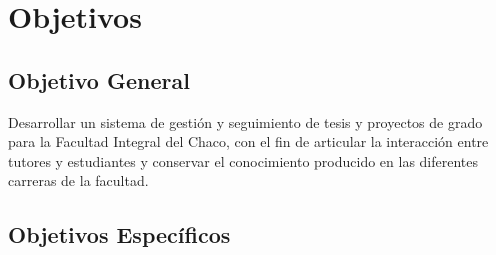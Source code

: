 \section{Objetivos}
\label{sec:objetivos}

\subsection{Objetivo General}
Desarrollar un sistema de gestión y seguimiento de tesis y proyectos de grado para la Facultad Integral del Chaco, con el fin de articular la interacción entre tutores y estudiantes y conservar el conocimiento producido en las diferentes carreras de la facultad.

\subsection{Objetivos Específicos}


\endinput
